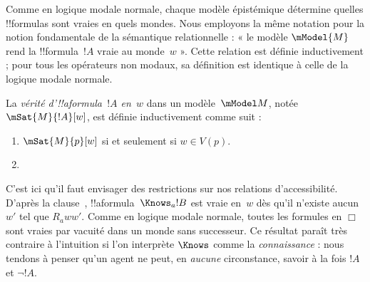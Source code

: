 \documentclass[../../../include/open-logic-section]{subfiles}
\begin{document}


Comme en logique modale normale, chaque modèle épistémique détermine
quelles !!{formula}s sont vraies en quels mondes. Nous employons la
même notation pour la notion fondamentale de la sémantique relationnelle :
« le modèle $\mModel{M}$ rend la !!{formula}~$!A$ vraie au monde~$w$ ».
Cette relation est définie inductivement ; pour tous les opérateurs
non modaux, sa définition est identique à celle de la logique modale normale.

\begin{defn}
  La \emph{vérité d'!!a{formula}~$!A$ en~$w$} dans
  un modèle~$\mModel M$, notée $\mSat{M}{!A}[w]$, est définie
  inductivement comme suit :
  \begin{enumerate}
  \item $\mSat{M}{p}[w]$ si et seulement si $w \in V(p)$.
  \item{}
  \end{enumerate}
\end{defn}

C'est ici qu'il faut envisager des restrictions sur nos relations
d'accessibilité. D'après la clause~,
!!a{formula}~$\Knows_a !B$ est vraie en~$w$ dès qu'il n'existe
aucun~$w'$ tel que $R_a ww'$. Comme en logique modale normale,
toutes les formules en $\Box$ sont vraies par vacuité dans un monde
sans successeur. Ce résultat paraît très contraire à l'intuition si
l'on interprète $\Knows$ comme la \emph{connaissance} : nous tendons
à penser qu'un agent ne peut, en \emph{aucune} circonstance, savoir
à la fois $!A$ et $\lnot !A$.
\end{document}
